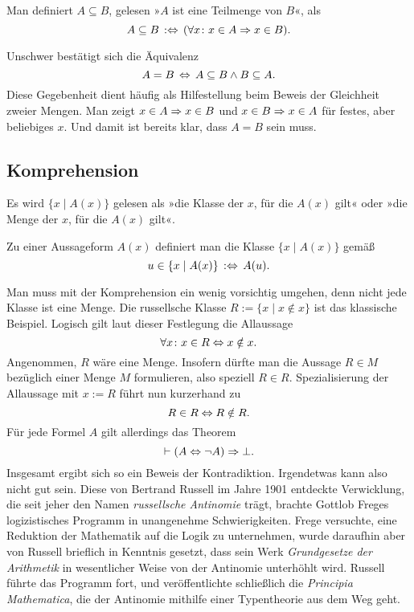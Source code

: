 \begin{Definition}[Inklusion]%
\label{def:Teilmenge}\newlinefirst
Man definiert $A\subseteq B$, gelesen »$A$ ist eine Teilmenge von $B$«, als
\[A\subseteq B\,:\Leftrightarrow\, (\forall x\colon x\in A\Rightarrow x\in B).\]
\end{Definition}
Unschwer bestätigt sich die Äquivalenz
\[A = B\,\Leftrightarrow\, A\subseteq B\land B\subseteq A.\]
Diese Gegebenheit dient häufig als Hilfestellung beim Beweis der
Gleichheit zweier Mengen. Man zeigt $x\in A\Rightarrow x\in B$ und
$x\in B\Rightarrow x\in A$ für festes, aber beliebiges $x$. Und damit ist
bereits klar, dass $A = B$ sein muss.

\subsection{Komprehension}

Es wird $\{x\mid A(x)\}$ gelesen als »die Klasse der $x$, für die
$A(x)$ gilt« oder »die Menge der $x$, für die $A(x)$ gilt«.
\begin{Definition}[Komprehension]%
\label{def:Komprehension}\newlinefirst
Zu einer Aussageform $A(x)$ definiert man die Klasse
$\{x\mid A(x)\}$ gemäß
\[u\in\{x\mid A(x)\}\,:\Leftrightarrow\, A(u).\]
\end{Definition}
Man muss mit der Komprehension ein wenig vorsichtig umgehen, denn nicht
jede Klasse ist eine Menge. Die russellsche Klasse $R := \{x\mid x\notin x\}$
ist das klassische Beispiel. Logisch gilt laut dieser Festlegung die
Allaussage
\[\forall x\colon x\in R\Leftrightarrow x\notin x.\]
Angenommen, $R$ wäre eine Menge. Insofern dürfte man die Aussage
$R\in M$ bezüglich einer Menge $M$ formulieren, also speziell $R\in R$.
Spezialisierung der Allaussage mit $x:=R$ führt nun kurzerhand zu
\[R\in R\Leftrightarrow R\notin R.\]
Für jede Formel $A$ gilt allerdings das Theorem
\[\vdash (A\Leftrightarrow\lnot A)\Rightarrow\bot.\]
Insgesamt ergibt sich so ein Beweis der Kontradiktion. Irgendetwas kann
also nicht gut sein. Diese von Bertrand Russell im Jahre 1901 entdeckte
Verwicklung, die seit jeher den Namen \emph{russellsche Antinomie}%
 trägt, brachte Gottlob Freges
logizistisches Programm in unangenehme Schwierigkeiten. Frege versuchte,
eine Reduktion der Mathematik auf die Logik zu unternehmen, wurde
daraufhin aber von Russell brieflich in Kenntnis gesetzt, dass sein
Werk \emph{Grundgesetze der Arithmetik} in wesentlicher Weise von der
Antinomie unterhöhlt wird. Russell führte das Programm fort, und
veröffentlichte schließlich die \emph{Principia Mathematica}, die der
Antinomie mithilfe einer Typentheorie aus dem Weg geht.

